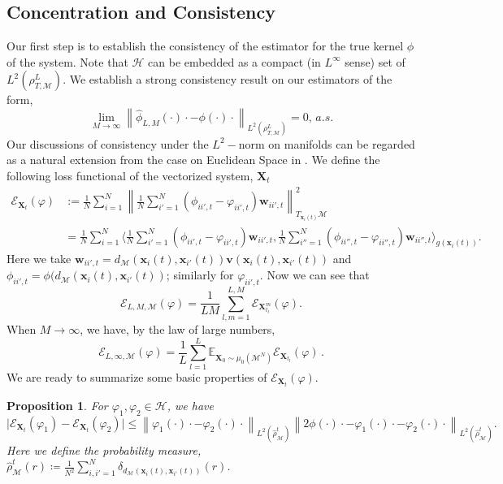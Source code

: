 \documentclass[11pt]{article}
\newcommand{\mbf}[1]{\boldsymbol{#1}}
\newcommand{\inprod}[1]{\langle #1 \rangle}
\newcommand{\abs}[1]{\big| #1 \big|}
\newcommand{\norm}[1]{\left\| #1 \right\|}
\newcommand{\bv}{\mbf{v}}
\newcommand{\bw}{\mbf{w}}
\newcommand{\bx}{\mbf{x}}
\newcommand{\bX}{\mbf{X}}
\newcommand{\mE}{\mathcal{E}}
\newcommand{\mH}{\mathcal{H}}
\newcommand{\mM}{\mathcal{M}}
\newcommand{\intkernel}{\phi}
\newcommand{\lintkernel}{\widehat{\intkernel}}
\newcommand{\intkernelvar}{\varphi}
\newcommand{\E}{\mathbb{E}}
\newcommand{\probIC}{\mu_0}
\newcommand{\muX}{\probIC(\mM^N)}
\newtheorem{prop}{Proposition}
\begin{document}
\subsection{Concentration and Consistency}
%
Our first step is to establish the consistency of the estimator for the true kernel $\intkernel$ of the system.  Note that $\mathcal{H}$ can be embedded as a compact (in $L^{\infty}$ sense) set of $L^2(\rho_{T, \mM}^L)$. We establish a strong consistency result on our estimators of the form,
\[
\lim\limits_{M \to \infty}\norm{\lintkernel_{L, M}(\cdot)\cdot - \intkernel(\cdot)\cdot}_{L^2(\rho_{T, \mM}^L)} = 0, \, a.s.
\] 
Our discussions of consistency under the $L^2-$norm on manifolds can be regarded as a natural extension from the case on Euclidean Space in \cite{Lu2019a}.  We define the following loss functional of the vectorized system, $\bX_t$ 
\begin{align}\label{loss at t}
\mE_{\bX_t}(\intkernelvar) &:= \frac{1}{N}\sum_{i = 1}^N\norm{\frac{1}{N}\sum_{i' = 1}^N(\intkernel_{ii', t} - \intkernelvar_{ii', t})\bw_{ii', t}}^2_{T_{\bx_i(t)}\mM} \nonumber \\
                            &= \frac{1}{N}\sum_{i = 1}^N\inprod{\frac{1}{N}\sum_{i' = 1}^N(\intkernel_{ii', t} - \intkernelvar_{ii', t})\bw_{ii', t}, \frac{1}{N}\sum_{i'' = 1}^N(\intkernel_{ii'', t} - \intkernelvar_{ii'', t})\bw_{ii'', t}}_{g(\bx_i(t))}.
\end{align}
Here we take $\bw_{ii', t} = d_{\mM}(\bx_i(t), \bx_{i'}(t))\bv(\bx_i(t), \bx_{i'}(t))$ and $\intkernel_{ii', t} = \intkernel(d_{\mM}(\bx_i(t), \bx_{i'}(t))$; similarly for $\intkernelvar_{ii', t}$.
Now we can see that 
\[
\mE_{L, M,\mM}(\intkernelvar) = \frac{1}{LM}\sum_{l, m = 1}^{L, M}\mE_{\bX^{m}_{t_l}}(\intkernelvar).
\]
When $M \to \infty$, we have, by the law of large numbers,
\[
\mE_{L, \infty, \mM}(\intkernelvar) = \frac{1}{L}\sum_{l = 1}^L\E_{\bX_0 \sim \muX}\mE_{\bX_{t_l}}(\intkernelvar)\,.
\]
We are ready to summarize some basic properties of $\mE_{\bX_t}(\intkernelvar)$. 
\begin{prop}\label{prop:continuity}
For $\intkernelvar_1, \intkernelvar_2 \in \mH$, we have
\begin{equation}\label{eq:continuity}
\abs{\mE_{\bX_t}(\intkernelvar_1) - \mE_{\bX_t}(\intkernelvar_2)} \leq \norm{\intkernelvar_1(\cdot)\cdot - \intkernelvar_2(\cdot)\cdot}_{L^2(\hat\rho^t_{\mM})}\norm{2\intkernel(\cdot)\cdot - \intkernelvar_1(\cdot)\cdot - \intkernelvar_2(\cdot)\cdot}_{L^2(\hat\rho^t_{\mM})}.
\end{equation}
Here we define the probability measure, $\hat{\rho}^t_{\mM}(r) \coloneqq \frac{1}{N^2}\sum_{i, i' =1}^{N}\delta_{d_{\mM}(\bx_i(t), \bx_{i'}(t))}(r)$.
\end{prop}
\end{document}
